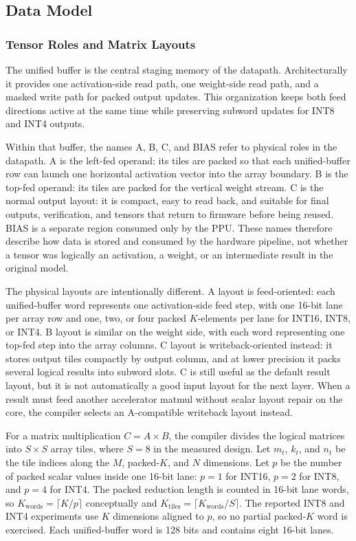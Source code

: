 \documentclass[a4paper, 12pt, titlepage]{article}
\begin{document}
\subsection{Data Model}

\subsubsection{Tensor Roles and Matrix Layouts}
The unified buffer is the central staging memory of the datapath. Architecturally it provides one activation-side read path, one weight-side read path, and a masked write path for packed output updates. This organization keeps both feed directions active at the same time while preserving subword updates for INT8 and INT4 outputs.

Within that buffer, the names A, B, C, and BIAS refer to physical roles in the datapath. A is the left-fed operand: its tiles are packed so that each unified-buffer row can launch one horizontal activation vector into the array boundary. B is the top-fed operand: its tiles are packed for the vertical weight stream. C is the normal output layout: it is compact, easy to read back, and suitable for final outputs, verification, and tensors that return to firmware before being reused. BIAS is a separate region consumed only by the PPU. These names therefore describe how data is stored and consumed by the hardware pipeline, not whether a tensor was logically an activation, a weight, or an intermediate result in the original model.

The physical layouts are intentionally different. A layout is feed-oriented: each unified-buffer word represents one activation-side feed step, with one 16-bit lane per array row and one, two, or four packed \(K\)-elements per lane for INT16, INT8, or INT4. B layout is similar on the weight side, with each word representing one top-fed step into the array columns. C layout is writeback-oriented instead: it stores output tiles compactly by output column, and at lower precision it packs several logical results into subword slots. C is still useful as the default result layout, but it is not automatically a good input layout for the next layer. When a result must feed another accelerator matmul without scalar layout repair on the core, the compiler selects an A-compatible writeback layout instead.

For a matrix multiplication \(C = A \times B\), the compiler divides the logical matrices into \(S \times S\) array tiles, where \(S=8\) in the measured design. Let \(m_t\), \(k_t\), and \(n_t\) be the tile indices along the \(M\), packed-\(K\), and \(N\) dimensions. Let \(p\) be the number of packed scalar values inside one 16-bit lane: \(p=1\) for INT16, \(p=2\) for INT8, and \(p=4\) for INT4. The packed reduction length is counted in 16-bit lane words, so \(K_{\mathrm{words}}=\lceil K/p\rceil\) conceptually and \(K_{\mathrm{tiles}}=\lceil K_{\mathrm{words}}/S\rceil\). The reported INT8 and INT4 experiments use \(K\) dimensions aligned to \(p\), so no partial packed-\(K\) word is exercised. Each unified-buffer word is 128 bits and contains eight 16-bit lanes.
\end{document}
